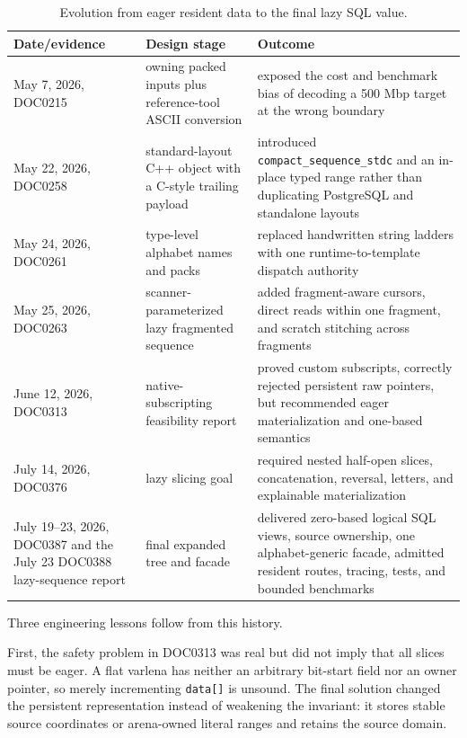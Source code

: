 \begin{table}[H]
\centering
\caption{Evolution from eager resident data to the final lazy SQL value.}
\label{tab:sequence-evolution}
\begingroup
\setlength{\tabcolsep}{5pt}
\renewcommand{\arraystretch}{1.08}
\begin{tabularx}{\textwidth}{@{}
  >{\raggedright\arraybackslash}p{}
  >{\raggedright\arraybackslash}p{}
  >{\raggedright\arraybackslash}X@{}}
\textbf{Date/evidence} & \textbf{Design stage} & \textbf{Outcome}\\
\hline
May 7, 2026, DOC0215 & owning packed inputs plus reference-tool ASCII conversion &
exposed the cost and benchmark bias of decoding a 500 Mbp target at the wrong
boundary\\
May 22, 2026, DOC0258 & standard-layout C++ object with a C-style trailing payload &
introduced \texttt{compact\_sequence\_stdc} and an in-place typed range rather
than duplicating PostgreSQL and standalone layouts\\
May 24, 2026, DOC0261 & type-level alphabet names and packs &
replaced handwritten string ladders with one runtime-to-template dispatch
authority\\
May 25, 2026, DOC0263 & scanner-parameterized lazy fragmented sequence &
added fragment-aware cursors, direct reads within one fragment, and scratch
stitching across fragments\\
June 12, 2026, DOC0313 & native-subscripting feasibility report &
proved custom subscripts, correctly rejected persistent raw pointers, but
recommended eager materialization and one-based semantics\\
July 14, 2026, DOC0376 & lazy slicing goal &
required nested half-open slices, concatenation, reversal, letters, and
explainable materialization\\
July 19--23, 2026, DOC0387 and the July 23 DOC0388 lazy-sequence report &
final expanded tree and facade &
delivered zero-based logical SQL views, source ownership, one alphabet-generic
facade, admitted resident routes, tracing, tests, and bounded benchmarks\\
\end{tabularx}
\endgroup
\end{table}

Three engineering lessons follow from this history.

First, the safety problem in DOC0313 was real but did not imply that all
slices must be eager.  A flat varlena has neither an arbitrary bit-start field
nor an owner pointer, so merely incrementing \texttt{data[]} is unsound.
The final solution changed the persistent representation instead of weakening
the invariant: it stores stable source coordinates or arena-owned literal
ranges and retains the source domain.

